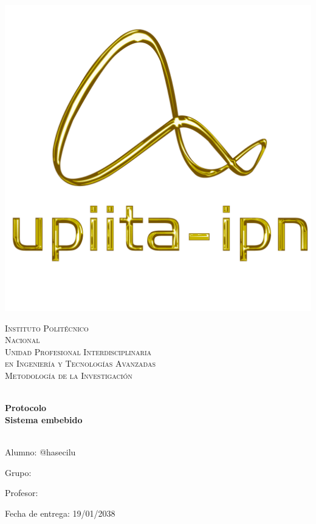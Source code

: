 \begin{center}
\begin{minipage}{0.48\textwidth} 
	\begin{flushright}
		\includegraphics[scale = 0.3]{images/logo_upiita_oro.png}
	\end{flushright}
\end{minipage}


\vspace*{-25mm}  %
\textsc{\Huge Instituto Polit\'ecnico\\ \vspace{15pt} Nacional}\\[20mm]

\textsc{\huge Unidad Profesional Interdisciplinaria\\  \vspace{10pt} en Ingenier\'ia y Tecnolog\'ias Avanzadas}\\[20mm]

\textsc{\LARGE Metodología de la Investigación}


\vspace*{10mm}
\HRule \\[4mm]
{ \huge \bfseries Protocolo\\}\vspace{5mm}
{\LARGE \bfseries Sistema embebido}\\[4mm]
\HRule \\[15mm]

\begin{flushleft}
	\Large Alumno: @hasecilu
\end{flushleft}
\vspace{5mm}
\begin{flushleft}
	\Large Grupo: 
\end{flushleft}
\vspace{5mm}
\begin{flushleft}
	\Large Profesor: 
\end{flushleft}
\vspace{25mm}

{\large Fecha de entrega: 19/01/2038}

\end{center}
